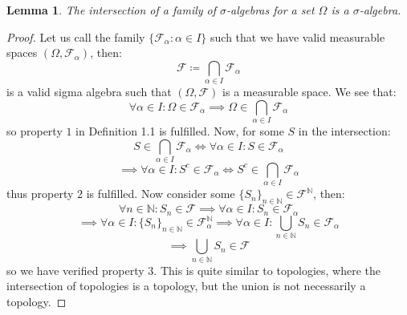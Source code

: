\documentclass[10pt,letterpaper]{article} %
\newtheorem{lem}{Lemma}[section]
\begin{document}
\begin{lem}
The intersection of a family of $\sigma$-algebras for a set $\Omega$ is a $\sigma$-algebra.
\end{lem}
\begin{proof}
Let us call the family $\{\mathcal{F}_\alpha: \alpha \in I\}$ such that we have valid measurable spaces $(\Omega, \mathcal{F}_\alpha)$, then:
\begin{equation*}
\mathcal{F} \coloneq \bigcap_{\alpha \in I}\mathcal{F}_\alpha
\end{equation*}
is a valid sigma algebra such that $(\Omega, \mathcal{F})$ is a measurable space. We see that:
\begin{equation*}
\forall \alpha \in I: \Omega \in \mathcal{F}_\alpha \implies \Omega \in \bigcap_{\alpha \in I}\mathcal{F}_\alpha
\end{equation*}
so property $1$ in Definition 1.1 is fulfilled. Now, for some $S$ in the intersection:
\begin{equation*}
S \in \bigcap_{\alpha \in I}\mathcal{F}_\alpha \iff \forall \alpha \in I: S \in \mathcal{F}_\alpha
\end{equation*}
\begin{equation*}
\implies \forall \alpha \in I: S^c \in \mathcal{F}_\alpha \iff S^c \in \bigcap_{\alpha \in I}\mathcal{F}_\alpha
\end{equation*}
thus property $2$ is fulfilled. Now consider some $\{S_n\}_{n \in \mathbb{N}} \in \mathcal{F}^\mathbb{N}$, then:
\begin{equation*}
\forall n \in \mathbb{N}: S_n \in \mathcal{F} \implies \forall \alpha \in I: S_n \in \mathcal{F}_\alpha 
\end{equation*}
\begin{equation*}
\implies \forall \alpha \in I: \{S_n\}_{n \in \mathbb{N}} \in \mathcal{F}_\alpha^\mathbb{N} \implies \forall \alpha \in I: \bigcup_{n \in \mathbb{N}}S_n \in \mathcal{F}_\alpha
\end{equation*}
\begin{equation*}
\implies \bigcup_{n \in \mathbb{N}}S_n \in \mathcal{F}
\end{equation*}
so we have verified property $3$. This is quite similar to topologies, where the intersection of topologies is a topology, but the union is not necessarily a topology.
\end{proof}
\end{document}
